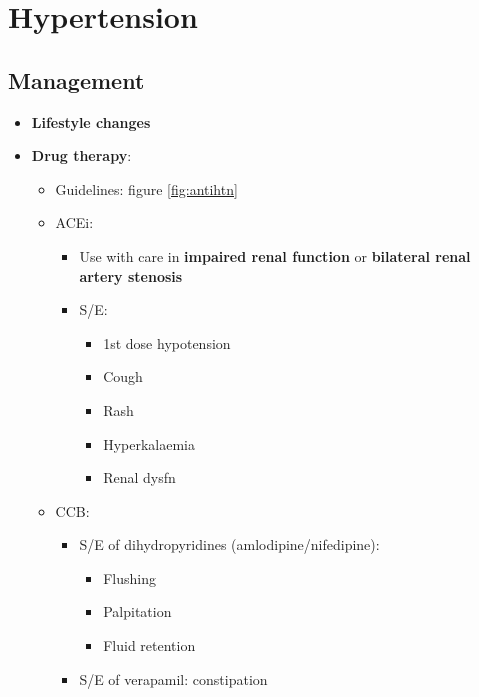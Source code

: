 \documentclass[
  12pt,
]{memoir}
\providecommand{\tightlist}{%
  \setlength{\itemsep}{0pt}\setlength{\parskip}{0pt}}
\begin{document}
\hypertarget{hypertension}{%
\section{Hypertension}\label{hypertension}}

\hypertarget{management-10}{%
\subsection{Management}\label{management-10}}

\begin{itemize}
\tightlist
\item
  \textbf{Lifestyle changes}
\item
  \textbf{Drug therapy}:

  \begin{itemize}
  \tightlist
  \item
    Guidelines: figure \ref{fig:antihtn}
  \item
    ACEi:

    \begin{itemize}
    \tightlist
    \item
      Use with care in \textbf{impaired renal function} or
      \textbf{bilateral renal artery stenosis}
    \item
      S/E:

      \begin{itemize}
      \tightlist
      \item
        1st dose hypotension
      \item
        Cough
      \item
        Rash
      \item
        Hyperkalaemia
      \item
        Renal dysfn
      \end{itemize}
    \end{itemize}
  \item
    CCB:

    \begin{itemize}
    \tightlist
    \item
      S/E of dihydropyridines (amlodipine/nifedipine):

      \begin{itemize}
      \tightlist
      \item
        Flushing
      \item
        Palpitation
      \item
        Fluid retention
      \end{itemize}
    \item
      S/E of verapamil: constipation
    \end{itemize}
  \end{itemize}
\end{itemize}
\end{document}
